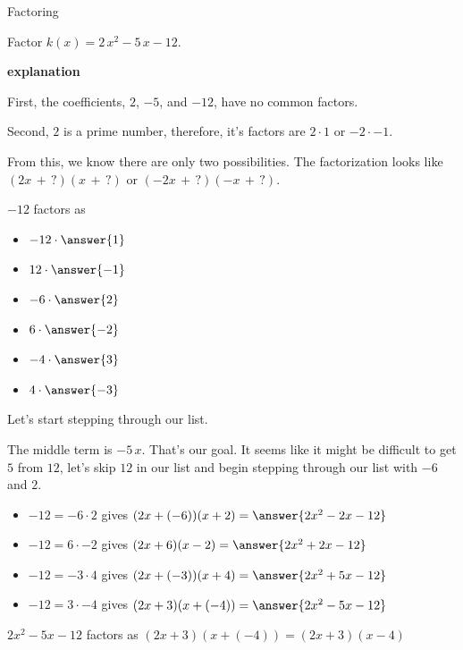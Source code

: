 \documentclass{ximera}
\begin{document}
\begin{example} Factoring

Factor $k(x) = 2 \, x^2 - 5 \, x - 12$.


\textbf{\textcolor{red!75!green}{explanation}} 

First, the coefficients, $2$, $-5$, and $-12$, have no common factors.


Second, $2$ is a prime number, therefore, it's factors are $2 \cdot 1$ or $-2 \cdot -1$.

From this, we know there are only two possibilities. The factorization looks like $(2 x \, + \, ?) (x \, + \, ?)$ or $(-2 x \, + \, ?) (-x \, + \, ?)$.






$-12$ factors as 
\begin{itemize}
\item $-12 \cdot \answer{1}$
\item $12 \cdot \answer{-1}$
\item $-6 \cdot \answer{2}$
\item $6 \cdot \answer{-2}$
\item $-4 \cdot \answer{3}$
\item $4 \cdot \answer{-3}$  
\end{itemize}



Let's start stepping through our list.

The middle term is $-5 \, x$.  That's our goal. It seems like it might be difficult to get $5$ from $12$, let's skip $12$ in our list and begin stepping through our list with $-6$ and $2$.

\begin{itemize}

\item $-12 = -6 \cdot 2$ gives $(2 x + (-6)) (x + 2) = \answer{2 x^2 - 2 x - 12}$
\item $-12 = 6 \cdot -2$ gives $(2 x + 6) (x - 2) = \answer{2 x^2 + 2 x -12}$
\item $-12 = -3 \cdot 4$ gives $(2 x + (-3)) (x + 4) = \answer{2 x^2 + 5 x - 12}$
\item $-12 = 3 \cdot -4$ gives $(2 x + 3) (x + (-4)) = \answer{2 x^2 - 5 x -12}$
\end{itemize}

$2 x^2 - 5 x - 12$ factors as $(2 x + 3) (x + (-4)) = (2 x + 3)(x - 4)$



\end{example}
\end{document}
